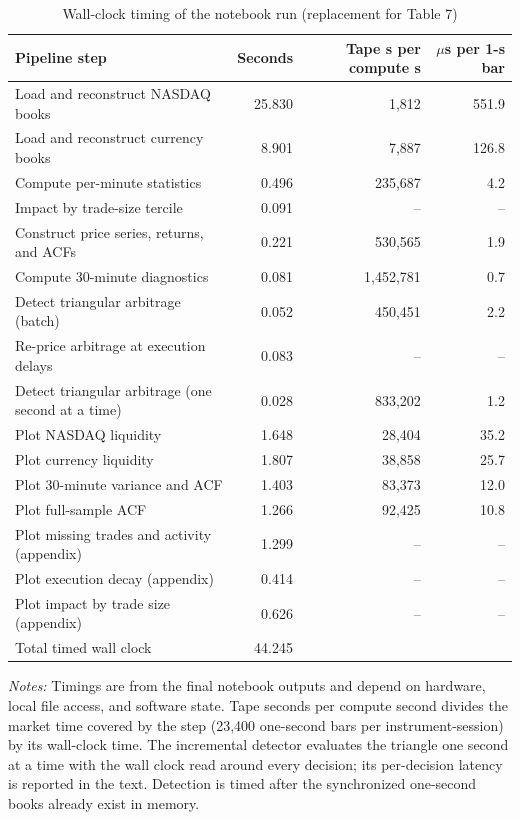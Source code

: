 \begin{table}[htbp]
\centering
\caption{Wall-clock timing of the notebook run (replacement for Table 7)}
\label{tab:timing}
\footnotesize
\begin{tabular}{lrrr}
\toprule
Pipeline step & Seconds & Tape s per compute s & $\mu$s per 1-s bar \\
\midrule
Load and reconstruct NASDAQ books & 25.830 & 1,812 & 551.9 \\
Load and reconstruct currency books & 8.901 & 7,887 & 126.8 \\
Compute per-minute statistics & 0.496 & 235,687 & 4.2 \\
Impact by trade-size tercile & 0.091 & -- & -- \\
Construct price series, returns, and ACFs & 0.221 & 530,565 & 1.9 \\
Compute 30-minute diagnostics & 0.081 & 1,452,781 & 0.7 \\
Detect triangular arbitrage (batch) & 0.052 & 450,451 & 2.2 \\
Re-price arbitrage at execution delays & 0.083 & -- & -- \\
Detect triangular arbitrage (one second at a time) & 0.028 & 833,202 & 1.2 \\
Plot NASDAQ liquidity & 1.648 & 28,404 & 35.2 \\
Plot currency liquidity & 1.807 & 38,858 & 25.7 \\
Plot 30-minute variance and ACF & 1.403 & 83,373 & 12.0 \\
Plot full-sample ACF & 1.266 & 92,425 & 10.8 \\
Plot missing trades and activity (appendix) & 1.299 & -- & -- \\
Plot execution decay (appendix) & 0.414 & -- & -- \\
Plot impact by trade size (appendix) & 0.626 & -- & -- \\
\midrule
Total timed wall clock & 44.245 &  &  \\
\bottomrule
\end{tabular}

\begin{minipage}{0.95\linewidth}\footnotesize\emph{Notes:} Timings are from the final notebook outputs and depend on hardware, local file access, and software state. Tape seconds per compute second divides the market time covered by the step (23,400 one-second bars per instrument-session) by its wall-clock time. The incremental detector evaluates the triangle one second at a time with the wall clock read around every decision; its per-decision latency is reported in the text. Detection is timed after the synchronized one-second books already exist in memory.\end{minipage}
\end{table}
